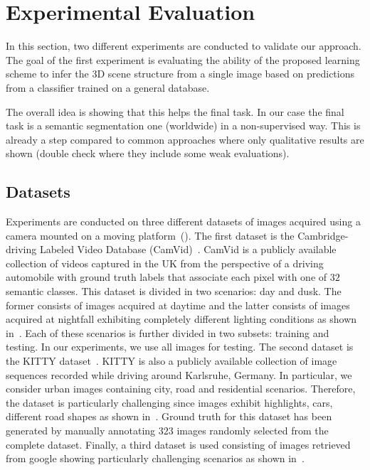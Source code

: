 \section{Experimental Evaluation}
 In this section, two different
experiments are conducted to validate our approach. The goal of
the first experiment is evaluating the ability of the proposed
learning scheme to infer the 3D scene structure from a single
image based on predictions from a classifier trained on a general
database.


The overall idea is showing that this helps the final task. In our case the final task is a semantic segmentation one (worldwide) in a non-supervised way. This is already a step compared to common approaches where only qualitative results are shown (double check \cite{vazquez:2014} where they include some weak evaluations).


\subsection{Datasets}
\label{subsect:datasets}
Experiments are conducted on three different datasets of images
acquired using a camera mounted on a moving
platform~(). The first dataset is the
Cambridge-driving Labeled Video Database
(CamVid)~\cite{CamVidBBDD:PRL2008}. CamVid is a publicly available
collection of videos captured in the UK from the
perspective of a driving automobile with ground truth labels that
associate each pixel with one of $32$ semantic classes. This
dataset is divided in two scenarios: day and dusk. The former
consists of images acquired at daytime and the latter consists of
images acquired at nightfall exhibiting completely different
lighting conditions as shown in~. Each of
these scenarios is further divided in two subsets: training and
testing. In our experiments, we use all images for testing. The second dataset is the KITTY dataset~\cite{Geiger2013IJRR}.
KITTY is also a publicly available collection of image sequences
recorded while driving around Karlsruhe, Germany. In particular,
we consider urban images containing city, road and residential
scenarios. Therefore, the dataset is particularly challenging
since images exhibit highlights, cars, different road shapes
as shown in~. Ground truth for this
dataset has been generated by manually annotating $323$ images
randomly selected from the complete dataset. Finally, a third dataset is used consisting of images retrieved from google showing particularly challenging scenarios as shown in~.

